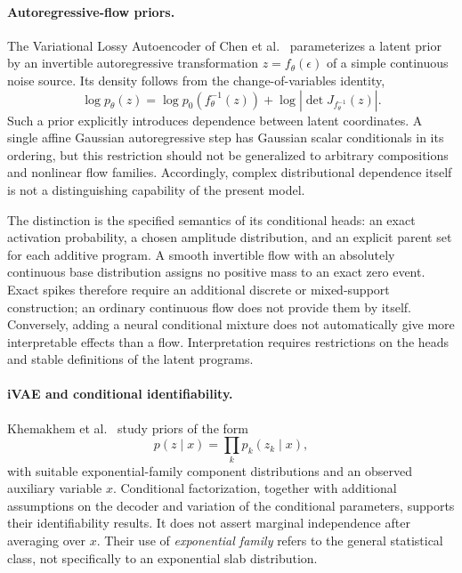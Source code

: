 \paragraph{Autoregressive-flow priors.}
The Variational Lossy Autoencoder of Chen et al.~\cite{vlae} parameterizes
a latent prior by an invertible autoregressive transformation
\(z=f_\theta(\epsilon)\) of a simple continuous noise source.
Its density follows from the change-of-variables identity,
\begin{equation}\label{eq:flowposition}
\log p_\theta(z)=
\log p_0(f_\theta^{-1}(z))
+\log\left|\det J_{f_\theta^{-1}}(z)\right|.
\end{equation}
Such a prior explicitly introduces dependence between latent coordinates.
A single affine Gaussian autoregressive step has Gaussian scalar
conditionals in its ordering, but this restriction should not be
generalized to arbitrary compositions and nonlinear flow families.
Accordingly, complex distributional dependence itself is not a
distinguishing capability of the present model.

The distinction is the specified semantics of its conditional heads:
an exact activation probability, a chosen amplitude distribution, and
an explicit parent set for each additive program. A smooth invertible
flow with an absolutely continuous base distribution assigns no positive
mass to an exact zero event. Exact spikes therefore require an additional
discrete or mixed-support construction; an ordinary continuous flow
does not provide them by itself. Conversely, adding a neural conditional
mixture does not automatically give more interpretable effects than a
flow. Interpretation requires restrictions on the heads and stable
definitions of the latent programs.

\paragraph{iVAE and conditional identifiability.}
Khemakhem et al.~\cite{ivae} study priors of the form
\begin{equation}\label{eq:ivaeposition}
p(z\mid x)=\prod_k p_k(z_k\mid x),
\end{equation}
with suitable exponential-family component distributions and an observed
auxiliary variable \(x\). Conditional factorization, together with
additional assumptions on the decoder and variation of the conditional
parameters, supports their identifiability results. It does not assert
marginal independence after averaging over \(x\).
Their use of \emph{exponential family} refers to the general statistical
class, not specifically to an exponential slab distribution.

